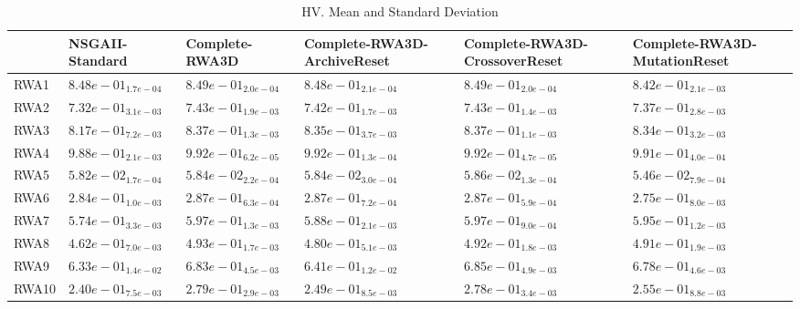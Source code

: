 \documentclass{article}
\begin{document}
\begin{table}
\caption{HV. Mean and Standard Deviation}
\label{table: HV}
\centering
\begin{scriptsize}
\begin{tabular}{llllll}
\hline & NSGAII-Standard & Complete-RWA3D & Complete-RWA3D-ArchiveReset & Complete-RWA3D-CrossoverReset &  Complete-RWA3D-MutationReset\\
\hline 
RWA1 & $  8.48e-01_{ 1.7e-04}$ & \cellcolor{gray95}$  8.49e-01_{ 2.0e-04}$ & $  8.48e-01_{ 2.1e-04}$ & \cellcolor{gray25}$  8.49e-01_{ 2.0e-04}$ & $  8.42e-01_{ 2.1e-03}$ \\
RWA2 & $  7.32e-01_{ 3.1e-03}$ & \cellcolor{gray95}$  7.43e-01_{ 1.9e-03}$ & $  7.42e-01_{ 1.7e-03}$ & \cellcolor{gray25}$  7.43e-01_{ 1.4e-03}$ & $  7.37e-01_{ 2.8e-03}$ \\
RWA3 & $  8.17e-01_{ 7.2e-03}$ & \cellcolor{gray25}$  8.37e-01_{ 1.3e-03}$ & $  8.35e-01_{ 3.7e-03}$ & \cellcolor{gray95}$  8.37e-01_{ 1.1e-03}$ & $  8.34e-01_{ 3.2e-03}$ \\
RWA4 & $  9.88e-01_{ 2.1e-03}$ & \cellcolor{gray95}$  9.92e-01_{ 6.2e-05}$ & $  9.92e-01_{ 1.3e-04}$ & \cellcolor{gray25}$  9.92e-01_{ 4.7e-05}$ & $  9.91e-01_{ 4.0e-04}$ \\
RWA5 & $  5.82e-02_{ 1.7e-04}$ & \cellcolor{gray25}$  5.84e-02_{ 2.2e-04}$ & $  5.84e-02_{ 3.0e-04}$ & \cellcolor{gray95}$  5.86e-02_{ 1.3e-04}$ & $  5.46e-02_{ 7.9e-04}$ \\
RWA6 & $  2.84e-01_{ 1.0e-03}$ & \cellcolor{gray25}$  2.87e-01_{ 6.3e-04}$ & \cellcolor{gray95}$  2.87e-01_{ 7.2e-04}$ & $  2.87e-01_{ 5.9e-04}$ & $  2.75e-01_{ 8.0e-03}$ \\
RWA7 & $  5.74e-01_{ 3.3e-03}$ & \cellcolor{gray95}$  5.97e-01_{ 1.3e-03}$ & $  5.88e-01_{ 2.1e-03}$ & \cellcolor{gray25}$  5.97e-01_{ 9.0e-04}$ & $  5.95e-01_{ 1.2e-03}$ \\
RWA8 & $  4.62e-01_{ 7.0e-03}$ & \cellcolor{gray95}$  4.93e-01_{ 1.7e-03}$ & $  4.80e-01_{ 5.1e-03}$ & \cellcolor{gray25}$  4.92e-01_{ 1.8e-03}$ & $  4.91e-01_{ 1.9e-03}$ \\
RWA9 & $  6.33e-01_{ 1.4e-02}$ & \cellcolor{gray25}$  6.83e-01_{ 4.5e-03}$ & $  6.41e-01_{ 1.2e-02}$ & \cellcolor{gray95}$  6.85e-01_{ 4.9e-03}$ & $  6.78e-01_{ 4.6e-03}$ \\
RWA10 & $  2.40e-01_{ 7.5e-03}$ & \cellcolor{gray95}$  2.79e-01_{ 2.9e-03}$ & $  2.49e-01_{ 8.5e-03}$ & \cellcolor{gray25}$  2.78e-01_{ 3.4e-03}$ & $  2.55e-01_{ 8.8e-03}$ \\
\hline
\end{tabular}
\end{scriptsize}
\end{table}
\end{document}
